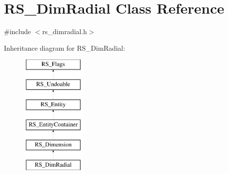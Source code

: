 \hypertarget{classRS__DimRadial}{\section{R\-S\-\_\-\-Dim\-Radial Class Reference}
\label{classRS__DimRadial}
}


{\ttfamily \#include $<$rs\-\_\-dimradial.\-h$>$}

Inheritance diagram for R\-S\-\_\-\-Dim\-Radial\-:\begin{figure}[H]
\begin{center}
\leavevmode
\includegraphics[height=6.000000cm]{classRS__DimRadial}
\end{center}
\end{figure}

